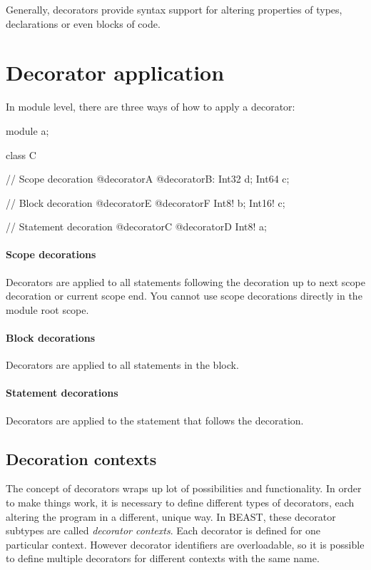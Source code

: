 Generally, decorators provide syntax support for altering properties of types, declarations or even blocks of code.

\section{Decorator application}
In module level, there are three ways of how to apply a decorator:
\begin{code}
module a;

class C {
	
// Scope decoration
@decoratorA @decoratorB:
	Int32 d;
	Int64 c;
	
	// Block decoration
	@decoratorE @decoratorF {
		Int8! b;
		Int16! c;	
	}
	
	// Statement decoration
	@decoratorC @decoratorD Int8! a;
				
}
\end{code}

\paragraph{Scope decorations} Decorators are applied to all statements following the decoration up to next scope decoration or current scope end. You cannot use scope decorations directly in the module root scope.

\paragraph{Block decorations} Decorators are applied to all statements in the block.

\paragraph{Statement decorations} Decorators are applied to the statement that follows the decoration.

\subsection{Decoration contexts} \label{decorationContexts}
The concept of decorators wraps up lot of possibilities and functionality. In order to make things work, it is necessary to define different types of decorators, each altering the program in a different, unique way. In BEAST, these decorator subtypes are called \textit{decorator contexts}. Each decorator is defined for one particular context. However decorator identifiers are overloadable, so it is possible to define multiple decorators for different contexts with the same name.

